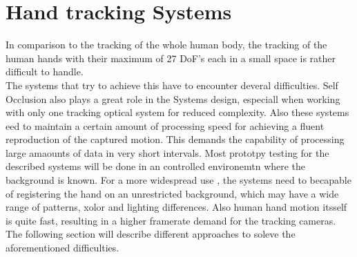 \section{Hand tracking Systems}
In comparison to the tracking of the whole human body, the tracking of the human hands with their maximum of 27 DoF's each in a small space is rather difficult to handle.\\
The systems that try to achieve this have to encounter  deveral difficulties. Self Occlusion also plays a great role in the Systems design, especiall when working with only one tracking optical system for reduced complexity. Also these systems eed to maintain a certain amount of processing speed for achieving a fluent reproduction of the captured motion. This demands the capability of processing large amaounts of data in very short intervals. Most prototpy testing for the described systems will be done in an controlled environemtn where the background is known. For a more widespread use , the systems need to becapable of registering the hand on an unrestricted background, which may have a wide range of patterns, xolor and lighting differences. Also human hand motion itsself is quite fast, resulting in a higher framerate demand for the tracking cameras.\\
The following section will describe different approaches to soleve the aforementioned difficulties.

